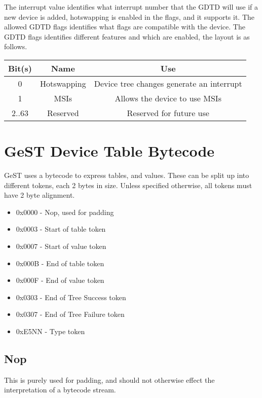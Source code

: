 \documentclass{article}
\begin{document}
The interrupt value identifies what interrupt number that the GDTD will use if a new device is added, hotswapping is enabled in the flags, and it supports it.
The allowed GDTD flags identifies what flags are compatible with the device. The GDTD flags identifies different features and which are enabled, the layout is as follows.
\\
\begin{center}
\begin{tabular}{ |c|c|c| }
    \hline
    Bit(s) & Name & Use \\
    \hline
    0 & Hotswapping & Device tree changes generate an interrupt \\
    \hline
    1 & MSIs & Allows the device to use MSIs\footnotemark[3] \\
    \hline
    2..63 & Reserved & Reserved for future use \\
    \hline
\end{tabular}
\end{center}

\pagebreak
\section{GeST Device Table Bytecode}
GeST uses a bytecode to express tables, and values. These can be split up into different tokens, each 2 bytes in size. Unless specified otherwise, all tokens must have 2 byte alignment.
\begin{itemize}
    \item 0x0000 - Nop, used for padding
    \item 0x0003 - Start of table token
    \item 0x0007 - Start of value token
    \item 0x000B - End of table token
    \item 0x000F - End of value token
    \item 0x0303 - End of Tree Success token
    \item 0x0307 - End of Tree Failure token
    \item 0xE5NN - Type token
\end{itemize}

\subsection{Nop}
This is purely used for padding, and should not otherwise effect the interpretation of a bytecode stream.
\end{document}
